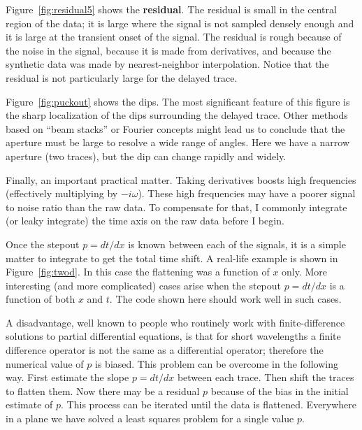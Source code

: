 \par
Figure~\ref{fig:residual5} shows the {\bf residual}.
The residual is small in the central region of the data;
it is large where the signal is not sampled densely enough
and it is large at the transient onset of the signal.
The residual is rough because of the noise in the signal,
because it is made from derivatives,
and because the synthetic data was made by nearest-neighbor interpolation.
Notice that the residual is not particularly large for the delayed trace. 
\par
Figure~\ref{fig:puckout} shows the dips.
The most significant feature of this figure
is the sharp localization of the dips surrounding the delayed trace.
Other methods based on ``beam stacks'' or Fourier concepts
might lead us to conclude that the aperture must be large
to resolve a wide range of angles.
Here we have a narrow aperture (two traces),
but the dip can change rapidly and widely.
\par
Finally, an important practical matter.   Taking derivatives
boosts high frequencies (effectively multiplying by $-i\omega$).
These high frequencies may have a poorer signal to noise ratio than the raw data.
To compensate for that, I commonly integrate (or leaky integrate)
the time axis on the raw data before I begin.


\par
Once the stepout $p = d t /d x$ is known between each of the signals, it is a simple matter to integrate to get the total time shift.  A real-life example is shown in Figure~\ref{fig:twod}.
%
%
In this case the flattening was a function of $x$ only.  More interesting (and more complicated) cases arise when the stepout $p = d t /d x$ is a function of both $x$ and $t$.  The code shown here should work well in such cases.
\par
A disadvantage, well known to people who routinely work with finite-difference solutions to partial differential equations, is that for short wavelengths a finite difference operator is not the same as a differential operator; therefore the numerical value of $p$ is biased.  This problem can be overcome in the following way.  First estimate the slope $p= d t /d x$ between each trace. Then shift the traces to flatten them.  Now there may be a residual $p$ because of the bias in the initial estimate of $p$.  This process can be iterated until the data is flattened.  Everywhere in a plane we have solved a least squares problem for a single value $p$.  
	
